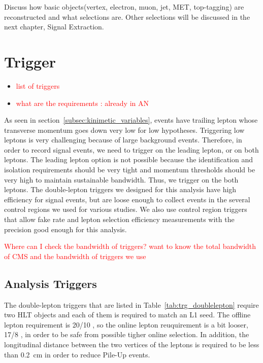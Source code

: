 Discuss how basic objects(vertex, electron, muon, jet, MET, top-tagging) 
are reconstructed and what selections are.
Other selections will be discussed in the next chapter, Signal Extraction.

\section{Trigger}
\label{sec:trigger}
\begin{itemize} 
\item \textcolor{red}{list of triggers} 
\item \textcolor{red}{what are the requirements : already in AN }
\end{itemize} 

As seen in section~\ref{subsec:kinimetic_variables}, \hww{} events have trailing lepton 
whose transverse momentum goes down very low for low \mHi{} hypotheses. Triggering low 
\pt{} leptons is very challenging because of large background events. 
Therefore, in order to record signal events, we need to trigger on the leading lepton, 
or on both leptons. The leading lepton option is not possible because the identification 
and isolation requirements should be very tight and momentum thresholds should be very 
high to maintain sustainable bandwidth. Thus, we trigger on the both leptons. 
The double-lepton triggers we designed for this analysis have high efficiency for  
signal events, but are loose enough to collect events in the several control regions 
we used for various studies. We also use control region triggers that allow 
fake rate and lepton selection efficiency measurements with the precision
good enough for this analysis. 

\textcolor{red}{Where can I check the bandwidth of triggers? want to know 
the total bandwidth of CMS and the bandwidth of triggers we use}

\subsection{Analysis Triggers}

The double-lepton triggers that are listed in Table~\ref{tab:trg_doublelepton} require 
two HLT objects and each of them is required to match an L1 seed. The offline lepton \pt{} 
requirement is 20/10 \GeV, so the online lepton \pt{} reuquirement is a bit looser, 17/8 \GeV, 
in order to be safe from possible tigher online selection. In addition,
the longitudinal distance between the two vertices of the leptons is required 
to be less than 0.2~cm in order to reduce Pile-Up events. 

